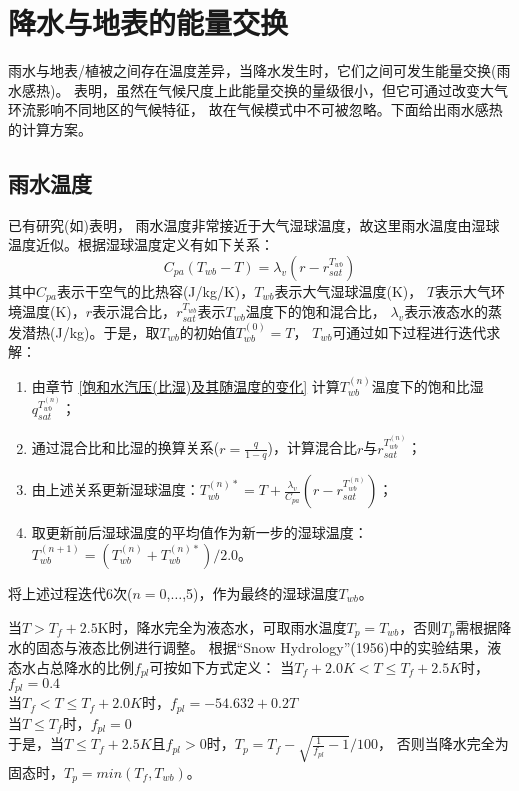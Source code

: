 \chapter{降水与地表的能量交换}

雨水与地表/植被之间存在温度差异，当降水发生时，它们之间可发生能量交换(雨水感热)。
\citet{wei2014impact} 表明，虽然在气候尺度上此能量交换的量级很小，但它可通过改变大气环流影响不同地区的气候特征，
故在气候模式中不可被忽略。下面给出雨水感热的计算方案。

\section{雨水温度}\label{雨水温度}
已有研究(如\citet{anderson1998moored})表明，
雨水温度非常接近于大气湿球温度，故这里雨水温度由湿球温度近似。根据湿球温度定义有如下关系：
\begin{equation}
C_{p a}\left(T_{w b}-T\right)=\lambda_{v}\left(r-r_{s a t}^{T_{w b}}\right)
\end{equation}
其中$C_{pa}$表示干空气的比热容(J/kg/K)，$T_{wb}$表示大气湿球温度(K)，
$T$表示大气环境温度(K)，$r$表示混合比，$r_{sat}^{T_{wb}}$表示$T_{wb}$温度下的饱和混合比，
$\lambda_v$表示液态水的蒸发潜热(J/kg)。于是，取$T_{wb}$的初始值$T_{wb}^{\left(0\right)}=T$，
$T_{wb}$可通过如下过程进行迭代求解：
\begin{enumerate}
    \item 由章节 \ref{饱和水汽压(比湿)及其随温度的变化} 计算$T_{wb}^{\left(n\right)}$温度下的饱和比湿$q_{sat}^{T_{wb}^{\left(n\right)}}$；
    \item 通过混合比和比湿的换算关系($r=\frac{q}{1-q}$)，计算混合比$r$与$r_{sat}^{T_{wb}^{\left(n\right)}}$；
    \item 由上述关系更新湿球温度：$T_{wb}^{\left(n\right)\ast}=T+\frac{\lambda_v}{C_{pa}}\left(r-r_{sat}^{T_{wb}^{\left(n\right)}}\right)$；
    \item 取更新前后湿球温度的平均值作为新一步的湿球温度：$T_{wb}^{\left(n+1\right)}=\left(T_{wb}^{\left(n\right)}+T_{wb}^{\left(n\right)\ast}\right)/2.0$。
\end{enumerate}
将上述过程迭代6次($n=0$,$\ldots$,5)，作为最终的湿球温度$T_{wb}$。


当$T>T_f+2.5$K时，降水完全为液态水，可取雨水温度$T_p=T_{wb}$，否则$T_p$需根据降水的固态与液态比例进行调整。
根据“Snow Hydrology”(1956)中的实验结果，液态水占总降水的比例$f_{pl}$可按如下方式定义：
当$T_f+2.0K<T\le T_f+2.5K$时，$f_{pl}=0.4$ \\
当$T_f<T\le T_f+2.0K$时，$f_{pl}=-54.632+0.2T$ \\
当$T\le T_f$时，$f_{pl}=0$ \\
于是，当$T\le T_f+2.5K$且$f_{pl}>0$时，$T_p=T_f-\sqrt{\frac{1}{f_{pl}}-1}/100$，
否则当降水完全为固态时，$T_p=min{\left(T_f,T_{wb}\right)}$。\\
